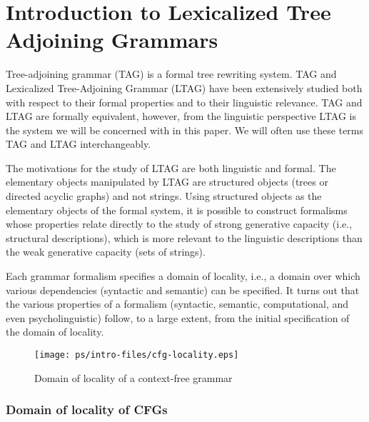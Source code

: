 
\chapter{Introduction to Lexicalized Tree Adjoining Grammars}
\label{intro-FBLTAG}

Tree-adjoining grammar (TAG) is a formal tree rewriting system. TAG and
Lexicalized Tree-Adjoining Grammar (LTAG) have been extensively studied both with
respect to their formal properties and to their linguistic relevance. TAG and
LTAG are formally equivalent, however, from the linguistic perspective LTAG is
the system we will be concerned with in this paper. We will often use these
terms TAG and LTAG interchangeably.

The motivations for the study of LTAG are both linguistic and formal. The
elementary objects manipulated by LTAG are structured objects (trees or
directed acyclic graphs) and not strings. Using structured objects as the
elementary objects of the formal system, it is possible to construct formalisms
whose properties relate directly to the study of strong generative capacity
(i.e., structural descriptions), which is more relevant to the linguistic
descriptions than the weak generative capacity (sets of strings). 

Each grammar formalism specifies a domain of locality, i.e., a domain over
which various dependencies (syntactic and semantic) can be specified. It turns
out that the various properties of a formalism (syntactic, semantic,
computational, and even psycholinguistic) follow, to a large extent, from the
initial specification of the domain of locality. 

\begin{figure*}[ht] 
\begin{center}
\texttt{[image: ps/intro-files/cfg-locality.eps]}
\caption{\label{cfg} Domain of locality of a context-free grammar}
\end{center}
\end{figure*}

\subsection{Domain of locality of CFGs} 

